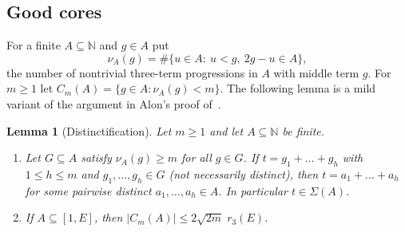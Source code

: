 \documentclass[11pt,reqno]{amsart}
\numberwithin{equation}{section}
\newtheorem{lemma}[theorem]{Lemma}
\theoremstyle{definition}
\theoremstyle{remark}
\newcommand{\N}{\mathbb{N}}
\newcommand{\card}[1]{\lvert #1\rvert}
\newcommand{\Sig}{\Sigma}
\begin{document}
\subsection{Good cores}
For a finite $A\subseteq\N$ and $g\in A$ put
\[
 \nu_A(g)=\#\{u\in A:\ u<g,\ 2g-u\in A\},
\]
the number of nontrivial three-term progressions in $A$ with middle term $g$. For $m\ge1$ let $C_m(A)=\{g\in A:\nu_A(g)<m\}$. The following lemma is a mild variant of the argument in Alon's proof of~\cite[Proposition~2.5]{Al87}.

\begin{lemma}[Distinctification]\label{lem:distinct}
Let $m\ge1$ and let $A\subseteq\N$ be finite.
\begin{enumerate}[label=\textup{(\alph*)}]
\item Let $G\subseteq A$ satisfy $\nu_A(g)\ge m$ for all $g\in G$. If $t=g_1+\dots+g_h$ with $1\le h\le m$ and $g_1,\dots,g_h\in G$ \textup{(}not necessarily distinct\textup{)}, then $t=a_1+\dots+a_h$ for some pairwise distinct $a_1,\dots,a_h\in A$. In particular $t\in\Sig(A)$.
\item If $A\subseteq[1,E]$, then $\card{C_m(A)}\le2\sqrt{2m}\;r_3(E)$.
\end{enumerate}
\end{lemma}
\end{document}
